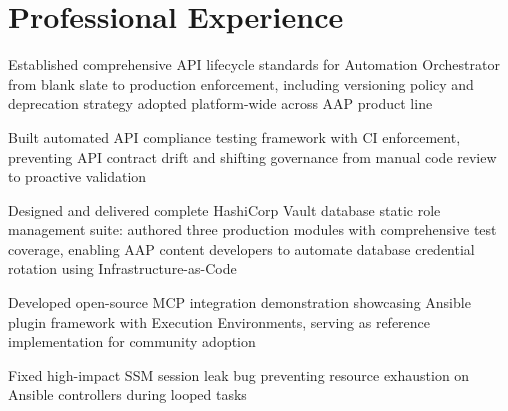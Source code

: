 \documentclass[]{deedy-resume-reversed}
\begin{document}
%
%

%
%

%
%

\begin{minipage}[t]{0.68\textwidth}

\section{Professional Experience}

\vspace{2mm}

\location{}
\vspace{\topsep}
\begin{tightemize}
\item Established comprehensive API lifecycle standards for Automation Orchestrator from blank slate to production enforcement, including versioning policy and deprecation strategy adopted platform-wide across AAP product line
\item Built automated API compliance testing framework with CI enforcement, preventing API contract drift and shifting governance from manual code review to proactive validation
\item Designed and delivered complete HashiCorp Vault database static role management suite: authored three production modules with comprehensive test coverage, enabling AAP content developers to automate database credential rotation using Infrastructure-as-Code
\item Developed open-source MCP integration demonstration showcasing Ansible plugin framework with Execution Environments, serving as reference implementation for community adoption
\item Fixed high-impact SSM session leak bug preventing resource exhaustion on Ansible controllers during looped tasks
\end{tightemize}


\end{minipage}
\end{document}
